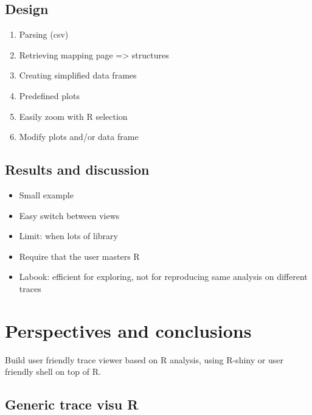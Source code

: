 \subsection{Design}

\begin{enumerate}
    \item Parsing (csv)
    \item Retrieving mapping page => structures
    \item Creating simplified data frames
    \item Predefined plots
    \item Easily zoom  with R selection
    \item Modify plots and/or data frame
\end{enumerate}

\subsection{Results and discussion}

\begin{itemize}
    \item Small example
    \item Easy switch between views
    \item Limit: when lots of library
    \item Require that the user masters R
    \item Labook: efficient for exploring, not for reproducing same analysis on different traces
\end{itemize}

\section{Perspectives and conclusions}
\label{sec:visu-cncl}

Build user friendly trace viewer based on R analysis, using R-shiny or user friendly shell on top of R.

\subsection{Generic trace visu R}

